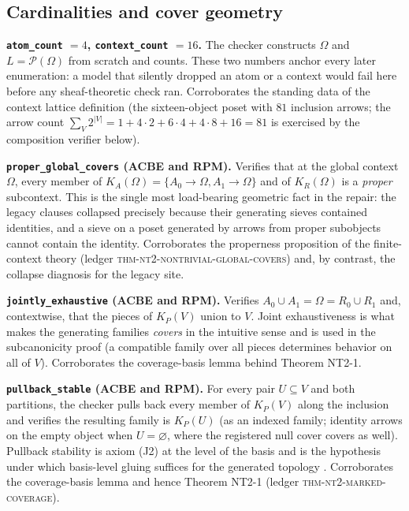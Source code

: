 \subsection{Cardinalities and cover geometry}
\label{ch11:sec:geometry}

\begin{checkclass}
\label{ch11:chk:cardinalities}
\textbf{\texttt{atom\_count} $= 4$, \texttt{context\_count} $= 16$.} The
checker constructs $\Omega$ and $L = \mathcal{P}(\Omega)$ from scratch and
counts. These two numbers anchor every later enumeration: a model that
silently dropped an atom or a context would fail here before any
sheaf-theoretic check ran. Corroborates the standing data of the context
lattice definition (the sixteen-object poset with $81$ inclusion arrows; the
arrow count $\sum_{V} 2^{|V|} = 1 + 4 \cdot 2 + 6 \cdot 4 + 4 \cdot 8 + 16 =
81$ is exercised by the composition verifier below).
\end{checkclass}

\begin{checkclass}
\label{ch11:chk:proper}
\textbf{\texttt{proper\_global\_covers} (ACBE and RPM).} Verifies that at the
global context $\Omega$, every member of $K_A(\Omega) = \{A_0 \to \Omega,
A_1 \to \Omega\}$ and of $K_R(\Omega)$ is a \emph{proper} subcontext. This is
the single most load-bearing geometric fact in the repair: the legacy
clauses collapsed precisely because their generating sieves contained
identities, and a sieve on a poset generated by arrows from proper subobjects
cannot contain the identity. Corroborates the properness proposition of the
finite-context theory (ledger \textsc{thm-nt2-nontrivial-global-covers}) and,
by contrast, the collapse diagnosis for the legacy site.
\end{checkclass}

\begin{checkclass}
\label{ch11:chk:exhaustive}
\textbf{\texttt{jointly\_exhaustive} (ACBE and RPM).} Verifies
$A_0 \cup A_1 = \Omega = R_0 \cup R_1$ and, contextwise, that the pieces of
$K_P(V)$ union to $V$. Joint exhaustiveness is what makes the generating
families \emph{covers} in the intuitive sense and is used in the
subcanonicity proof (a compatible family over all pieces determines behavior
on all of $V$). Corroborates the coverage-basis lemma behind Theorem NT2-1.
\end{checkclass}

\begin{checkclass}
\label{ch11:chk:pullback}
\textbf{\texttt{pullback\_stable} (ACBE and RPM).} For every pair
$U \subseteq V$ and both partitions, the checker pulls back every member of
$K_P(V)$ along the inclusion and verifies the resulting family is $K_P(U)$
(as an indexed family; identity arrows on the empty object when
$U = \varnothing$, where the registered null cover covers as well). Pullback
stability is axiom (J2) at the level of the basis and is the hypothesis under
which basis-level gluing suffices for the generated topology
\cite{stacks00ZC}. Corroborates the coverage-basis lemma and hence Theorem
NT2-1 (ledger \textsc{thm-nt2-marked-coverage}).
\end{checkclass}

